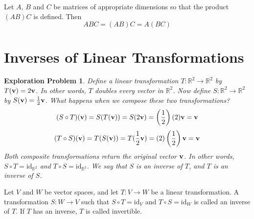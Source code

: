 \documentclass{ximera}
\renewcommand{\vec}[1]{{\bf #1}}
\newcommand{\RR}{\mathbb{R}}
\newcommand{\dfn}{\textit}
\newcommand{\id}{\text{id}}
\newtheorem{initprob}{Exploration Problem}
\begin{document}
\begin{theorem} \label{th:associativematrixmult}  Let $A$, $B$ and $C$ be matrices of appropriate dimensions so that the product $(AB)C$ is defined.  Then
$$ABC=(AB)C=A(BC)$$
\end{theorem}

\section*{Inverses of Linear Transformations}

\begin{initprob}\label{ep:inverse} Define a linear transformation $T:\RR^2\rightarrow \RR^2$ by $T(\vec{v})=2\vec{v}$.  In other words, $T$ doubles every vector in $\RR^2$.  Now define $S:\RR^2\rightarrow \RR^2$ by $S(\vec{v})=\frac{1}{2}\vec{v}$.  What happens when we compose these two transformations?
$$(S\circ T)(\vec{v})=S(T(\vec{v}))=S(2\vec{v})=\left(\frac{1}{2}\right)(2)\vec{v}=\vec{v}$$
$$(T\circ S)(\vec{v})=T(S(\vec{v}))=T(\frac{1}{2}\vec{v})=(2)\left(\frac{1}{2}\right)\vec{v}=\vec{v}$$
Both composite transformations return the original vector $\vec{v}$.  In other words, $S\circ T=\id_{\RR^2}$ and $T\circ S=\id_{\RR^2}$.  We say that $S$ is an \dfn{inverse} of $T$, and $T$ is an inverse of $S$.
\end{initprob}

\begin{definition}\label{def:inverse} Let $V$ and $W$ be vector spaces, and let $T:V\rightarrow W$ be a linear transformation.  A transformation $S:W\rightarrow V$ such that $S\circ T=\id_V$ and $T\circ S=\id_W$ is called an inverse of $T$. If $T$ has an inverse, $T$ is called invertible.
\end{definition}
\end{document}
